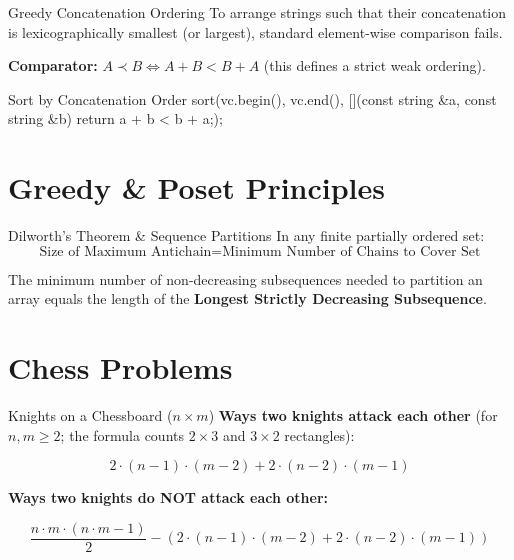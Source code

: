 \documentclass[10pt]{article}
\newcommand{\complexity}[1]{%
  \tcbox[on line,
    colback=tagbg,
    colframe=tagbg,
    boxrule=0pt,
    arc=2pt,
    boxsep=0pt,
    left=3.5pt, right=3.5pt, top=1.5pt, bottom=1.5pt
  ]{\color{tagtext}\scriptsize\bfseries\ensuremath{#1}}%
}
\begin{document}
\begin{conceptbox}{Greedy Concatenation Ordering}
    To arrange strings such that their concatenation is lexicographically smallest (or largest), standard element-wise comparison fails.
    \begin{resultbox}
        \textbf{Comparator:} $A \prec B \iff A + B < B + A$ (this defines a strict weak ordering).
    \end{resultbox}
\end{conceptbox}

\begin{vscode}{Sort by Concatenation Order \complexity{O(N \log N \cdot L)}}
sort(vc.begin(), vc.end(), [](const string &a, const string &b) 
{ return a + b < b + a;});
\end{vscode}


\newpage
\section{Greedy \& Poset Principles}

\begin{conceptbox}{Dilworth's Theorem \& Sequence Partitions}
    In any finite partially ordered set:
    \[ \text{Size of Maximum Antichain} = \text{Minimum Number of Chains to Cover Set} \]
    \begin{resultbox}
        The minimum number of non-decreasing subsequences needed to partition an array equals the length of the \textbf{Longest Strictly Decreasing Subsequence}.
    \end{resultbox}
\end{conceptbox}



\section{Chess Problems}

\begin{conceptbox}{Knights on a Chessboard ($n \times m$)}
    \textbf{Ways two knights attack each other} (for $n, m \ge 2$; the formula counts $2 \times 3$ and $3 \times 2$ rectangles):
    \begin{resultbox}
        \[ 2 \cdot (n - 1) \cdot (m - 2) + 2 \cdot (n - 2) \cdot (m - 1) \]
    \end{resultbox}

    \textbf{Ways two knights do NOT attack each other:}
    \begin{resultbox}
        \[
            \frac{n \cdot m \cdot (n \cdot m - 1)}{2} - \left(2 \cdot (n - 1) \cdot (m - 2) + 2 \cdot (n - 2) \cdot (m - 1)\right)
        \]
    \end{resultbox}
\end{conceptbox}
\end{document}

